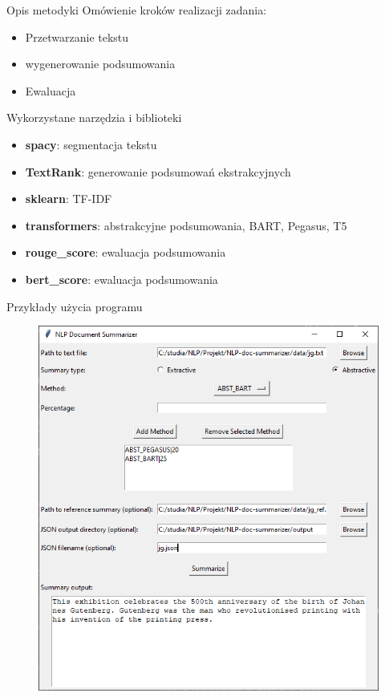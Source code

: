 \documentclass[aspectratio=169,xcolor=dvipsnames]{beamer}
\begin{document}

\begin{frame}{Opis metodyki}
    Omówienie kroków realizacji zadania:
    \begin{itemize}
        \item Przetwarzanie tekstu
        \item wygenerowanie podsumowania
        \item Ewaluacja
    \end{itemize}
\end{frame}


\begin{frame}{Wykorzystane narzędzia i biblioteki}
    \begin{itemize}
        \item \textbf{spacy}: segmentacja tekstu
        \item \textbf{TextRank}: generowanie podsumowań ekstrakcyjnych
        \item \textbf{sklearn}: TF-IDF
        \item \textbf{transformers}: abstrakcyjne podsumowania, BART, Pegasus, T5
        \item \textbf{rouge\_score}: ewaluacja podsumowania
        \item \textbf{bert\_score}: ewaluacja podsumowania
    \end{itemize}
\end{frame}


\begin{frame}{Przykłady użycia programu}
    \begin{figure}
        \includegraphics[width=0.6\linewidth]{gui_example.PNG}
        \end{figure}
\end{frame}
\end{document}
